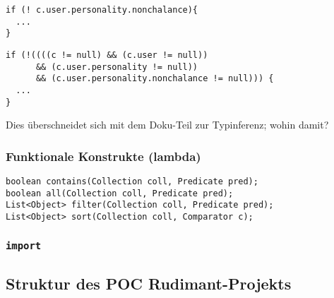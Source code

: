 \begin{minipage}{0.4\textwidth}
\begin{verbatim}
if (! c.user.personality.nonchalance){
  ...
}
\end{verbatim}
\end{minipage}
\begin{minipage}{0.6\textwidth}
\begin{verbatim}
if (!((((c != null) && (c.user != null))
      && (c.user.personality != null))
      && (c.user.personality.nonchalance != null))) {
  ...
}
\end{verbatim}
\end{minipage}

Dies überschneidet sich mit dem Doku-Teil zur Typinferenz; wohin damit?

\subsubsection{Funktionale Konstrukte (lambda)}
\begin{verbatim}
boolean contains(Collection coll, Predicate pred);
boolean all(Collection coll, Predicate pred);
List<Object> filter(Collection coll, Predicate pred);
List<Object> sort(Collection coll, Comparator c);
\end{verbatim}

\subsubsection{\texttt{import}}


\subsection{Struktur des POC Rudimant-Projekts}

